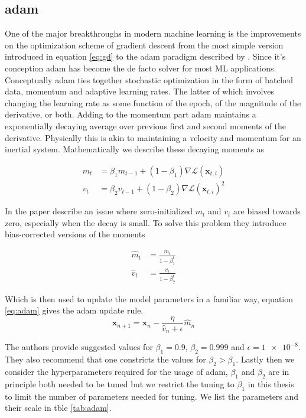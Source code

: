 \subsection{adam}\label{sec:adam}
One of the major breakthroughs in modern machine learning is the improvements on the optimization scheme of gradient descent from the most simple version introduced in equation \ref{eq:gd} to the adam paradigm described by \citet{Kingma2015}. Since it's conception adam has become the de facto solver for most ML applications. Conceptually adam ties together stochastic optimization in the form of batched data, momentum and adaptive learning rates. The latter of which involves changing the learning rate as some function of the epoch, of the magnitude of the derivative, or both. Adding to the momentum part adam maintains a exponentially decaying average over previous first and second moments of the derivative. Physically this is akin to maintaining a velocity and momentum for an inertial system. Mathematically we describe these decaying moments as 

\begin{align}
m_t &= \beta_1 m_{t-1} +(1-\beta_1)\nabla \mathcal{L}(\mathbf{x}_{t, i}) \\
v_t &= \beta_2 v_{t-1} +(1-\beta_2)\nabla \mathcal{L}(\mathbf{x}_{t, i})^2
\end{align}

\noindent In the paper \citet{Kingma2015} describe an issue where zero-initialized $m_t$ and $v_t$ are biased towards zero, especially when the decay is small. To solve this problem they introduce bias-corrected versions of the moments 

\begin{align}
\hat{m}_t &= \frac{m_t}{1 - \beta_1^t} \\
\hat{v}_t &= \frac{v_t}{1 - \beta_2^t} 
\end{align}

\noindent Which is then used to update the model parameters in a familiar way, equation \ref{eq:adam} gives the adam update rule. 
\begin{equation}\label{eq:adam}
\mathbf{x}_{n+1} = \mathbf{x}_{n} - \frac{\eta}{\hat{v}_n + \epsilon}\hat{m}_n
\end{equation}

\noindent The authors provide suggested values for $\beta_1 =0.9 $, $\beta_2 =0.999$ and $\epsilon = \num{1e-8}$. They also recommend that one constricts the values for $\beta_2 > \beta_1$. Lastly then we consider the hyperparameters required for the usage of adam, $\beta_1$ and $\beta_2$ are in principle both needed to be tuned but we restrict the tuning to $\beta_1$ in this thesis to limit the number of parameters needed for tuning. We list the parameters and their scale in tble \ref{tab:adam}.

